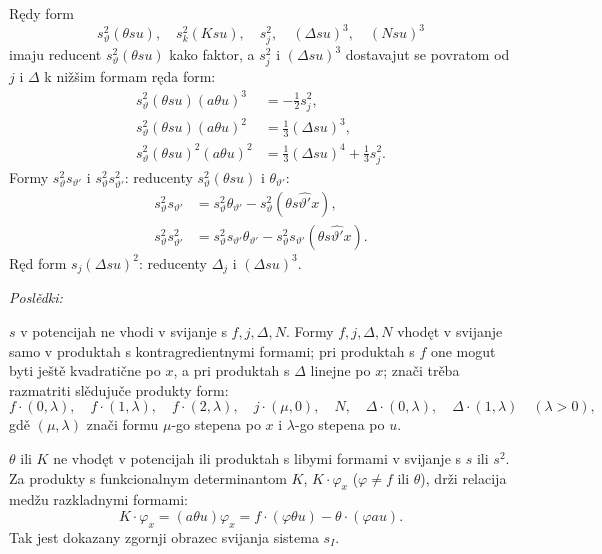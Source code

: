 \documentclass[11pt]{article}
\begin{document}
Rędy form
\[
 s_\vartheta^2(\theta su),\quad s_k^2(Ksu),\quad s_j^2,\quad (\Delta su)^3,\quad (Nsu)^3
\]
imaju reducent $s_\vartheta^2(\theta su)$ kako faktor, a $s_j^2$ i $(\Delta su)^3$ dostavajut se povratom od $j$ i $\Delta$ k nižšim formam ręda form:
\[
\begin{aligned}
s_\vartheta^2(\theta su)(a\theta u)^3&=-\frac12s_j^2,\\
s_\vartheta^2(\theta su)(a\theta u)^2&=\frac13(\Delta su)^3,\\
s_\vartheta^2(\theta su)^2(a\theta u)^2&=\frac13(\Delta su)^4+\frac13s_j^2.
\end{aligned}
\]
Formy $s_\vartheta^2s_{\vartheta'}$ i $s_\vartheta^2s_{\vartheta'}^2$: reducenty $s_\vartheta^2(\theta su)$ i $\theta_{\vartheta'}$:
\[
\begin{aligned}
s_\vartheta^2s_{\vartheta'}&=s_\vartheta^2\theta_{\vartheta'}-s_\vartheta^2(\theta s\widehat{\vartheta'}x),\\
s_\vartheta^2s_{\vartheta'}^2&=s_\vartheta^2s_{\vartheta'}\theta_{\vartheta'}-s_\vartheta^2s_{\vartheta'}(\theta s\widehat{\vartheta'}x).
\end{aligned}
\]
Ręd form $s_j(\Delta su)^2$: reducenty $\Delta_j$ i $(\Delta su)^3$.

\noindent\textit{Poslědki:}

$s$ v potencijah ne vhodi v svijanje s $f,j,\Delta,N$. Formy $f,j,\Delta,N$ vhodęt v svijanje samo v produktah s kontragredientnymi formami; pri produktah s $f$ one mogut byti ještě kvadratične po $x$, a pri produktah s $\Delta$ linejne po $x$; znači trěba razmatriti slědujuče produkty form:
\[
 f\cdot(0,\lambda),\quad f\cdot(1,\lambda),\quad f\cdot(2,\lambda),\quad
 j\cdot(\mu,0),\quad N,\quad
 \Delta\cdot(0,\lambda),\quad \Delta\cdot(1,\lambda)\quad(\lambda>0),
\]
gdě $(\mu,\lambda)$ znači formu $\mu$-go stepena po $x$ i $\lambda$-go stepena po $u$.

$\theta$ ili $K$ ne vhodęt v potencijah ili produktah s libymi formami v svijanje s $s$ ili $s^2$. Za produkty s funkcionalnym determinantom $K$, $K\cdot\varphi_x$ ($\varphi\ne f$ ili $\theta$), drži relacija medžu razkladnymi formami:
\[
K\cdot\varphi_x=(a\theta u)\varphi_x=f\cdot(\varphi\theta u)-\theta\cdot(\varphi a u).
\]
Tak jest dokazany zgornji obrazec svijanja sistema $s_I$.
\end{document}
